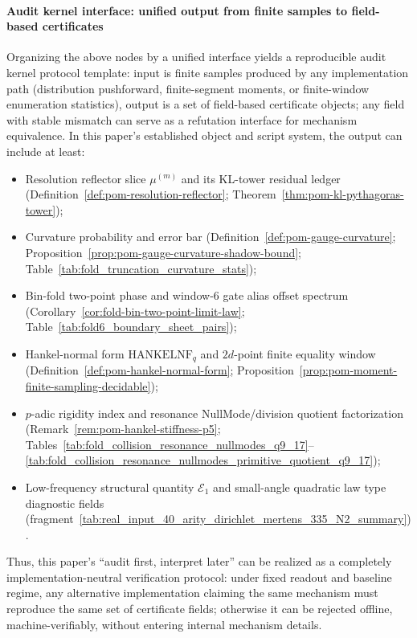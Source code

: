 \paragraph{Audit kernel interface: unified output from finite samples to field-based certificates}
Organizing the above nodes by a unified interface yields a reproducible audit kernel protocol template:
input is finite samples produced by any implementation path (distribution pushforward, finite-segment moments, or finite-window enumeration statistics), output is a set of field-based certificate objects; any field with stable mismatch can serve as a refutation interface for mechanism equivalence.
In this paper's established object and script system, the output can include at least:
\begin{itemize}
  \item Resolution reflector slice \(\mu^{(m)}\) and its KL-tower residual ledger (Definition~\ref{def:pom-resolution-reflector}; Theorem~\ref{thm:pom-kl-pythagoras-tower});
  \item Curvature probability and error bar (Definition~\ref{def:pom-gauge-curvature}; Proposition~\ref{prop:pom-gauge-curvature-shadow-bound}; Table~\ref{tab:fold_truncation_curvature_stats});
  \item Bin-fold two-point phase and window-\(6\) gate alias offset spectrum (Corollary~\ref{cor:fold-bin-two-point-limit-law}; Table~\ref{tab:fold6_boundary_sheet_pairs});
  \item Hankel-normal form \(\mathrm{HANKELNF}_q\) and \(2d\)-point finite equality window (Definition~\ref{def:pom-hankel-normal-form}; Proposition~\ref{prop:pom-moment-finite-sampling-decidable});
  \item \(p\)-adic rigidity index and resonance NullMode/division quotient factorization (Remark~\ref{rem:pom-hankel-stiffness-p5}; Tables~\ref{tab:fold_collision_resonance_nullmodes_q9_17}--\ref{tab:fold_collision_resonance_nullmodes_primitive_quotient_q9_17});
  \item Low-frequency structural quantity \(\mathcal{E}_1\) and small-angle quadratic law type diagnostic fields (fragment~\ref{tab:real_input_40_arity_dirichlet_mertens_335_N2_summary}).
\end{itemize}
Thus, this paper's ``audit first, interpret later'' can be realized as a completely implementation-neutral verification protocol: under fixed readout and baseline regime, any alternative implementation claiming the same mechanism must reproduce the same set of certificate fields; otherwise it can be rejected offline, machine-verifiably, without entering internal mechanism details.



